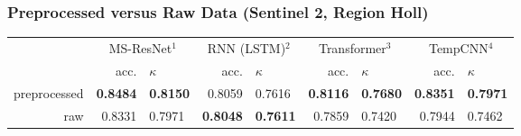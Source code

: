 \begin{frame}
\frametitle{Preprocessed versus Raw Data (Sentinel 2, Region Holl)}

\begin{tabular}{rrlrlrlrl}
\toprule
& \multicolumn{2}{c}{MS-ResNet$^1$} & \multicolumn{2}{c}{RNN (LSTM)$^2$} & \multicolumn{2}{c}{Transformer$^3$} & \multicolumn{2}{c}{TempCNN$^4$} \\
& acc. & $\kappa$ & acc. & $\kappa$ & acc. & $\kappa$ & acc. & $\kappa$ \\
\cmidrule(lr){2-3}\cmidrule(lr){4-5} \cmidrule(lr){6-7}\cmidrule(lr){8-9}
preprocessed & \textbf{0.8484} & \textbf{0.8150} & 0.8059 & 0.7616 & \textbf{0.8116} & \textbf{0.7680} & \textbf{0.8351} & \textbf{0.7971} \\
raw 		 & 0.8331 & 0.7971 & \textbf{0.8048} & \textbf{0.7611} & 0.7859 & 0.7420 & 0.7944 & 0.7462 \\
\bottomrule
\end{tabular}

%
%	
%	
%	
%	
%	

\end{frame}


